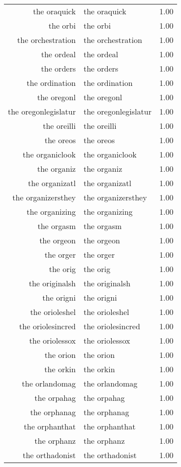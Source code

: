 \begin{table}[ht]
\begin{tabular}{rlr}
  the oraquick & the oraquick & 1.00 \\ 
  the orbi & the orbi & 1.00 \\ 
  the orchestration & the orchestration & 1.00 \\ 
  the ordeal & the ordeal & 1.00 \\ 
  the orders & the orders & 1.00 \\ 
  the ordination & the ordination & 1.00 \\ 
  the oregonl & the oregonl & 1.00 \\ 
  the oregonlegislatur & the oregonlegislatur & 1.00 \\ 
  the oreilli & the oreilli & 1.00 \\ 
  the oreos & the oreos & 1.00 \\ 
  the organiclook & the organiclook & 1.00 \\ 
  the organiz & the organiz & 1.00 \\ 
  the organizatl & the organizatl & 1.00 \\ 
  the organizersthey & the organizersthey & 1.00 \\ 
  the organizing & the organizing & 1.00 \\ 
  the orgasm & the orgasm & 1.00 \\ 
  the orgeon & the orgeon & 1.00 \\ 
  the orger & the orger & 1.00 \\ 
  the orig & the orig & 1.00 \\ 
  the originalsh & the originalsh & 1.00 \\ 
  the origni & the origni & 1.00 \\ 
  the orioleshel & the orioleshel & 1.00 \\ 
  the oriolesincred & the oriolesincred & 1.00 \\ 
  the oriolessox & the oriolessox & 1.00 \\ 
  the orion & the orion & 1.00 \\ 
  the orkin & the orkin & 1.00 \\ 
  the orlandomag & the orlandomag & 1.00 \\ 
  the orpahag & the orpahag & 1.00 \\ 
  the orphanag & the orphanag & 1.00 \\ 
  the orphanthat & the orphanthat & 1.00 \\ 
  the orphanz & the orphanz & 1.00 \\ 
  the orthadonist & the orthadonist & 1.00 \\ 

\end{tabular}
\end{table}
